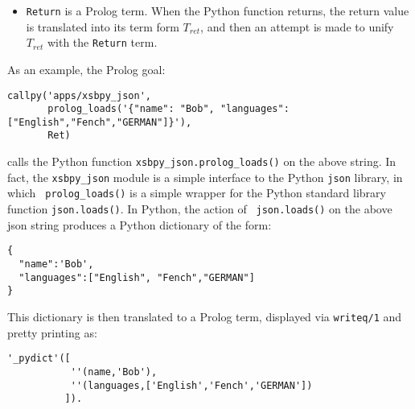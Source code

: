 \begin{description}
\begin{itemize}
\begin{itemize}
         {\tt '\_\$pydict'(DictList)}

         where {\tt DictList} is a list of tuples in term form: 

         {\tt ''(Key,Value)}

         where {\tt Key} and {\tt Value} are the translations of any
         Python data structures that are both allowable as a
         dictionary key or value, and supported by {\tt xsbpy}.  For
         instance, {\tt Value} can be (the term form of) a list, a
         set, a tuple or another dictionary.

       \item {\em Set Types}: A Python set {\em S} is translated to
         the term form

         {\tt '\_\$pyset'(SetList)}

         where {\em SetList} is the list containing exactly the
         translated elements of $S$.  Due to Python's implementation
         of sets, there is no guarantee that the order of $S$ and
         $SetList$ will be the same.
       \item {\em Boolean Types:} are not yet supported. 
       \item {\em Binary Types:} are not yet supported.  There are no
         current plans to support this type.
     \end{itemize}
   \item {\tt Return} is a Prolog term.  When the Python function
     returns, the return value is translated into its term form
     $T_{ret}$, and then an attempt is made to unify $T_{ret}$ with
     the {\tt Return} term.
 \end{itemize}

 As an example, the Prolog goal:

 \begin{verbatim}
callpy('apps/xsbpy_json',
       prolog_loads('{"name": "Bob", "languages": ["English","Fench","GERMAN"]}'),
       Ret)
\end{verbatim}
 
\noindent 
calls the Python function {\tt xsbpy\_json.prolog\_loads()} on the
above string.  In fact, the {\tt xsbpy\_json} module is a simple
interface to the Python {\tt json} library, in which {\tt
  prolog\_loads()} is a simple wrapper for the Python standard library
function {\tt json.loads()}.  In Python, the action of {\tt
  json.loads()} on the above json string produces a Python dictionary
of the form:
\begin{verbatim}
{
  "name":'Bob',
  "languages":["English", "Fench","GERMAN"]
}
\end{verbatim}
This dictionary is then translated to a Prolog term, displayed via
{\tt writeq/1} and pretty printing as:
\begin{verbatim}
'_pydict'([
           ''(name,'Bob'),
           ''(languages,['English','Fench','GERMAN'])
          ]).
\end{verbatim}


\end{description}
